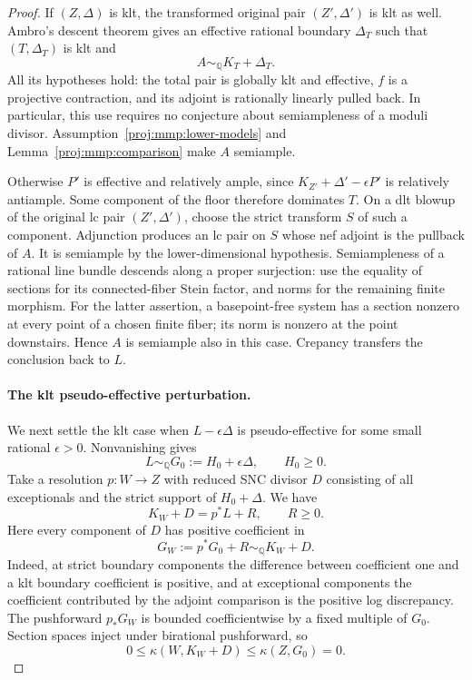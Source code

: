 \documentclass[11pt,letterpaper]{article}
\newcommand{\Q}{\mathbb{Q}}
\theoremstyle{definition}
\theoremstyle{remark}
\begin{document}
\begin{proof}
If \((Z,\Delta)\) is klt, the transformed original pair
\((Z',\Delta')\) is klt as well. Ambro's descent theorem
\cite[Theorem~0.2]{Proj-Ambro2005} gives an effective rational
boundary \(\Delta_T\) such that \((T,\Delta_T)\) is klt and
\[
 A\sim_{\Q}K_T+\Delta_T.
\]
All its hypotheses hold: the total pair is globally klt and
effective, \(f\) is a projective contraction, and its adjoint
is rationally linearly pulled back. In particular, this use
requires no conjecture about semiampleness of a moduli divisor.
Assumption~\ref{proj:mmp:lower-models} and
Lemma~\ref{proj:mmp:comparison} make \(A\) semiample.

Otherwise \(P'\) is effective and relatively ample, since
\(K_{Z'}+\Delta'-\epsilon P'\) is relatively antiample.
Some component of the floor therefore dominates \(T\).
On a dlt blowup of the original lc pair \((Z',\Delta')\),
choose the strict transform \(S\) of such a component.
Adjunction produces an lc pair on \(S\) whose nef adjoint
is the pullback of \(A\).
It is semiample by the lower-dimensional hypothesis.
Semiampleness of a rational line bundle descends along a proper
surjection: use the equality of sections for its connected-fiber
Stein factor, and norms for the remaining finite morphism.
For the latter assertion, a basepoint-free system has a section
nonzero at every point of a chosen finite fiber; its norm is
nonzero at the point downstairs. Hence \(A\) is semiample
also in this case. Crepancy transfers the conclusion back to \(L\).

\paragraph{The klt pseudo-effective perturbation.}
We next settle the klt case when \(L-\epsilon\Delta\) is
pseudo-effective for some small rational \(\epsilon>0\).
Nonvanishing gives
\[
 L\sim_{\Q}G_0:=H_0+\epsilon\Delta,\qquad H_0\geq 0.
\]
Take a resolution \(p\colon W\to Z\) with reduced SNC divisor
\(D\) consisting of all exceptionals and the strict support of
\(H_0+\Delta\). We have
\[
 K_W+D=p^*L+R,\qquad R\geq 0.
\]
Here every component of \(D\) has positive coefficient in
\[
 G_W:=p^*G_0+R\sim_{\Q}K_W+D.
\]
Indeed, at strict boundary components the difference between
coefficient one and a klt boundary coefficient is positive,
and at exceptional components the coefficient contributed by
the adjoint comparison is the positive log discrepancy.
The pushforward \(p_*G_W\) is bounded coefficientwise by a
fixed multiple of \(G_0\). Section spaces inject under
birational pushforward, so
\[
 0\leq\kappa(W,K_W+D)\leq\kappa(Z,G_0)=0.
\]


\end{proof}
\end{document}
